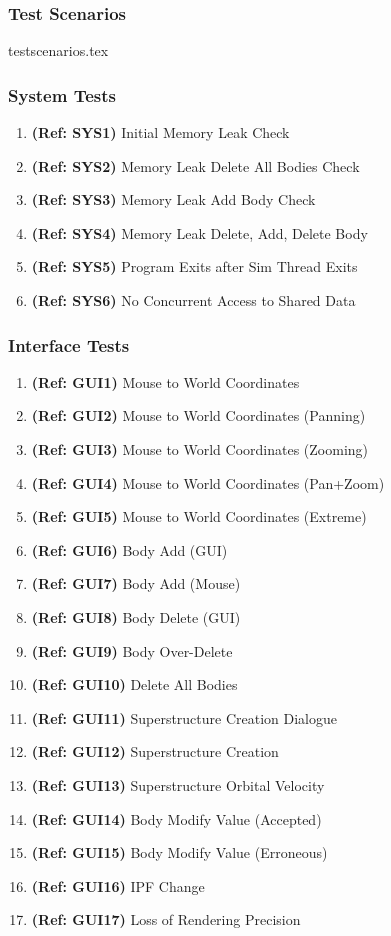 \pagebreak
\subsubsection{Test Scenarios}
{testscenarios.tex}

\pagebreak
\subsubsection{System Tests}
\vspace{12pt}
\begin{enumerate}
\item \textbf{(Ref: SYS1)} Initial Memory Leak Check
\item \textbf{(Ref: SYS2)} Memory Leak Delete All Bodies Check
\item \textbf{(Ref: SYS3)} Memory Leak Add Body Check
\item \textbf{(Ref: SYS4)} Memory Leak Delete, Add, Delete Body
\item \textbf{(Ref: SYS5)} Program Exits after Sim Thread Exits
\item \textbf{(Ref: SYS6)} No Concurrent Access to Shared Data
\end{enumerate}

\subsubsection{Interface Tests}
\vspace{12pt}
\begin{enumerate}
\item \textbf{(Ref: GUI1)} Mouse to World Coordinates
\item \textbf{(Ref: GUI2)} Mouse to World Coordinates (Panning)
\item \textbf{(Ref: GUI3)} Mouse to World Coordinates (Zooming)
\item \textbf{(Ref: GUI4)} Mouse to World Coordinates (Pan+Zoom)
\item \textbf{(Ref: GUI5)} Mouse to World Coordinates (Extreme)
\item \textbf{(Ref: GUI6)} Body Add (GUI)
\item \textbf{(Ref: GUI7)} Body Add (Mouse)
\item \textbf{(Ref: GUI8)} Body Delete (GUI)
\item \textbf{(Ref: GUI9)} Body Over-Delete 
\item \textbf{(Ref: GUI10)} Delete All Bodies 
\item \textbf{(Ref: GUI11)} Superstructure Creation Dialogue
\item \textbf{(Ref: GUI12)} Superstructure Creation
\item \textbf{(Ref: GUI13)} Superstructure Orbital Velocity
\item \textbf{(Ref: GUI14)} Body Modify Value (Accepted)
\item \textbf{(Ref: GUI15)} Body Modify Value (Erroneous)
\item \textbf{(Ref: GUI16)} IPF Change
\item \textbf{(Ref: GUI17)} Loss of Rendering Precision
\end{enumerate}

